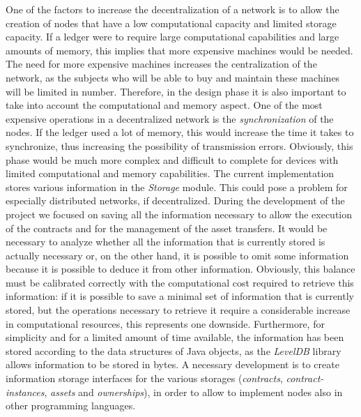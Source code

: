 One of the factors to increase the decentralization of a network is to allow the creation of nodes that 
have a low computational capacity and limited storage capacity. If a ledger were to require large 
computational capabilities and large amounts of memory, this implies that more expensive machines would be 
needed. The need for more expensive machines increases the centralization of the network, as the subjects 
who will be able to buy and maintain these machines will be limited in number. Therefore, in the design 
phase it is also important to take into account the computational and memory aspect. One of the most 
expensive operations in a decentralized network is the \textit{synchronization} of the nodes. If the ledger 
used a lot of memory, this would increase the time it takes to synchronize, thus increasing the possibility 
of transmission errors. Obviously, this phase would be much more complex and difficult to complete for 
devices with limited computational and memory capabilities. The current implementation stores various 
information in the \textit{Storage} module. This could pose a problem for especially distributed networks, 
if decentralized. During the development of the project we focused on saving all the information necessary 
to allow the execution of the contracts and for the management of the asset transfers. It would be necessary 
to analyze whether all the information that is currently stored is actually necessary or, on the other hand, 
it is possible to omit some information because it is possible to deduce it from other information. 
Obviously, this balance must be calibrated correctly with the computational cost required to retrieve this 
information: if it is possible to save a minimal set of information that is currently stored, but the 
operations necessary to retrieve it require a considerable increase in computational resources, this 
represents one downside. Furthermore, for simplicity and for a limited amount of time available, the 
information has been stored according to the data structures of Java objects, as the \textit{LevelDB} 
library allows information to be stored in bytes. A necessary development is to create information storage 
interfaces for the various storages (\textit{contracts}, \textit{contract-instances}, \textit{assets} and 
\textit{ownerships}), in order to allow to implement nodes also in other programming languages.

